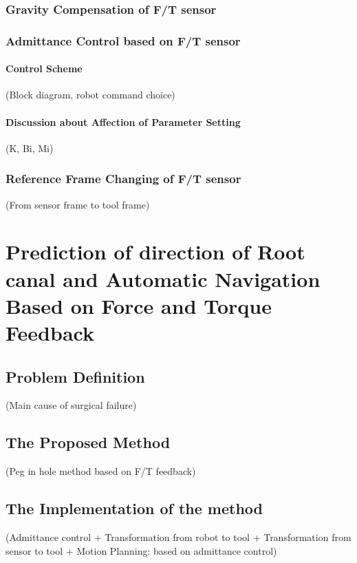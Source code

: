 \documentclass[12pt]{report}
\begin{document}
\begin{CJK}{UTF8}{bsmi}
\subsection{Gravity Compensation of F/T sensor}
\subsection{Admittance Control based on F/T sensor}
\subsubsection{Control Scheme}
(Block diagram, robot command choice)\\
\subsubsection{Discussion about Affection of Parameter Setting}
(K, Bi, Mi)\\
\subsection{Reference Frame Changing of F/T sensor}  
(From sensor frame to tool frame)\\
\chapter{Prediction of direction of Root canal and Automatic Navigation Based on Force and Torque Feedback}
\section{Problem Definition}
(Main cause of surgical failure)\\
\section{The Proposed Method}
(Peg in hole method based on F/T feedback)\\
\section{The Implementation of the method}
(Admittance control + Transformation from robot to tool + Transformation from sensor to tool + Motion Planning: based on admittance control)\\

\end{CJK}
\end{document}

